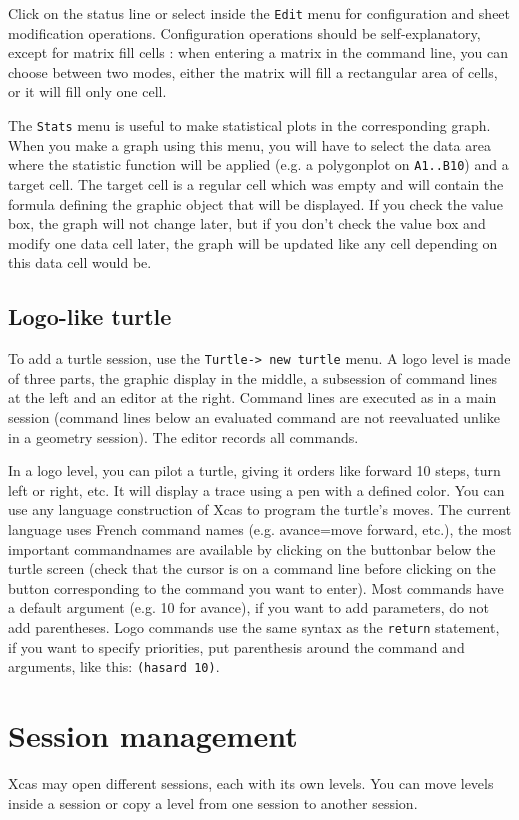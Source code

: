 \documentclass{article}
\begin{document}
Click on the status line or select inside the \verb|Edit| menu
for configuration and sheet modification operations. Configuration
operations should be self-explanatory, except for matrix fill cells : 
when entering a matrix in the command line, 
you can choose between two modes, either the matrix will fill
a rectangular area of cells, or it will fill only one cell.

The \verb|Stats|
menu is useful to make statistical plots in the corresponding graph.
When you make a graph using this menu, you will have to select
the data area where the statistic function will be applied (e.g.
a polygonplot on \verb|A1..B10|) and a target cell. The target
cell is a regular cell which was empty and will contain the formula
defining the graphic object that will be displayed. If you check the
value box, the graph will not change later, but if you don't check
the value box and modify
one data cell later, the graph will be updated like any cell 
depending on this data cell would be.

\subsection{Logo-like turtle}
To add a turtle session, use the \verb|Turtle-> new turtle| menu.
A logo level is made of three parts, the graphic display 
in the middle, a subsession of command lines at the left
and an editor at the right. Command lines are executed as in
a main session (command lines below an evaluated command
are not reevaluated unlike in a geometry session). The editor
records all commands.

In a logo level, you can pilot a turtle, giving it orders like forward
10 steps, turn left or right, etc. It will display a trace
using a pen with a defined color. 
You can use any language construction of Xcas to program the
turtle's moves. The current language uses French command names
(e.g. avance=move forward, etc.), the most important commandnames
are available by clicking on the buttonbar below the turtle screen
(check that the cursor is on a command line before clicking on
the button corresponding to the command you want to enter).
Most commands have a default argument (e.g. 10 for avance),
if you want to add parameters, do not add parentheses. Logo
commands use the same syntax as the \verb|return| statement,
if you want to specify priorities, put parenthesis around
the command and arguments, like this: \verb|(hasard 10)|.

\section{Session management}
Xcas may open different sessions, each with its own levels.
You can move levels inside a session or copy a level from one
session to another session.
\end{document}
